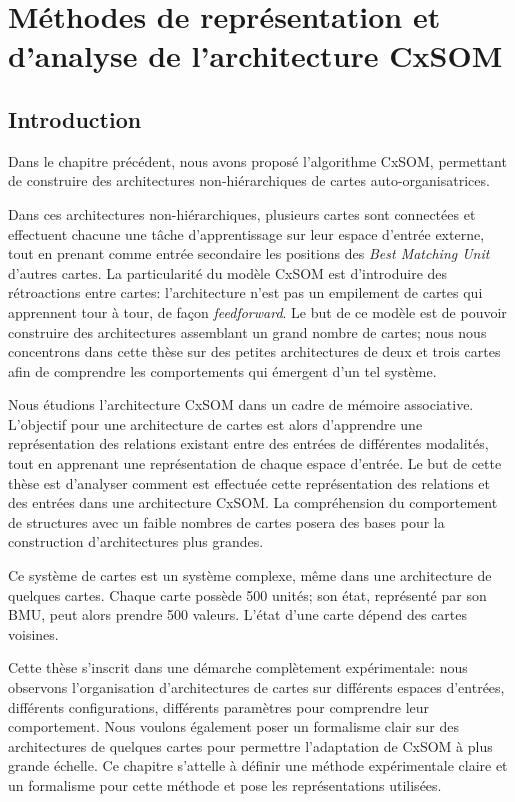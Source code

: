 \chapter{Méthodes de représentation et d'analyse de l'architecture CxSOM}
\graphicspath{{03-Representation/}}
\minitoc

\section{Introduction}
Dans le chapitre précédent, nous avons proposé l'algorithme CxSOM, permettant de construire des architectures non-hiérarchiques de cartes auto-organisatrices. 

Dans ces architectures non-hiérarchiques, plusieurs cartes sont connectées et effectuent chacune une tâche d'apprentissage sur leur espace d'entrée externe, tout en prenant comme entrée secondaire les positions des \emph{Best Matching Unit} d'autres cartes. La particularité du modèle CxSOM est d'introduire des rétroactions entre cartes: l'architecture n'est pas un empilement de cartes qui apprennent tour à tour, de façon \emph{feedforward}.
Le but de ce modèle est de pouvoir construire des architectures assemblant un grand nombre de cartes; nous nous concentrons dans cette thèse sur des petites architectures de deux et trois cartes afin de comprendre les comportements qui émergent d'un tel système.

Nous étudions l'architecture CxSOM dans un cadre de mémoire associative.
L'objectif pour une architecture de cartes est alors d'apprendre une représentation des relations existant entre des entrées de différentes modalités, tout en apprenant une représentation de chaque espace d'entrée.
Le but de cette thèse est d'analyser comment est effectuée cette représentation des relations et des entrées dans une architecture CxSOM.
La compréhension du comportement de structures avec un faible nombres de cartes posera des bases pour la construction d'architectures plus grandes.

Ce système de cartes est un système complexe, même dans une architecture de quelques cartes. Chaque carte possède 500 unités; son état, représenté par son BMU, peut alors prendre 500 valeurs. L'état d'une carte dépend des cartes voisines.

Cette thèse s'inscrit dans une démarche complètement expérimentale: nous observons l'organisation d'architectures de cartes sur différents espaces d'entrées, différents configurations, différents paramètres pour comprendre leur comportement. Nous voulons également poser un formalisme clair sur des architectures de quelques cartes pour permettre l'adaptation de CxSOM à plus grande échelle.
Ce chapitre s'attelle à définir une méthode expérimentale claire et un formalisme pour cette méthode et pose les représentations utilisées.

